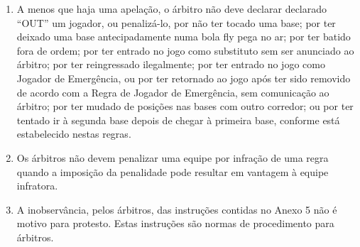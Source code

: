 \begin{multicols}{2}
\begin{enumerate}[label=\alph*)]
		\item  A menos que haja uma apelação, o árbitro não deve declarar declarado “OUT” um jogador, ou penalizá-lo, por não ter tocado uma base; por ter deixado uma base antecipadamente numa bola \gls{fly} pega no ar; por ter batido fora de ordem; por ter entrado no jogo como substituto sem ser anunciado ao árbitro; por ter reingressado ilegalmente; por ter entrado no jogo como Jogador de Emergência, ou por ter retornado ao jogo após ter sido removido de acordo com a Regra de Jogador de Emergência, sem comunicação ao árbitro; por ter mudado de posições nas bases com outro corredor; ou por ter tentado ir à segunda base depois de chegar à primeira base, conforme está estabelecido nestas regras.

		\item  Os árbitros não devem penalizar uma equipe por infração de uma regra quando a imposição da penalidade pode resultar em vantagem à equipe infratora.

		\item  A inobservância, pelos árbitros, das instruções contidas no Anexo 5 não é motivo para protesto. Estas instruções são normas de procedimento para árbitros.
	\end{enumerate}
\end{multicols}

